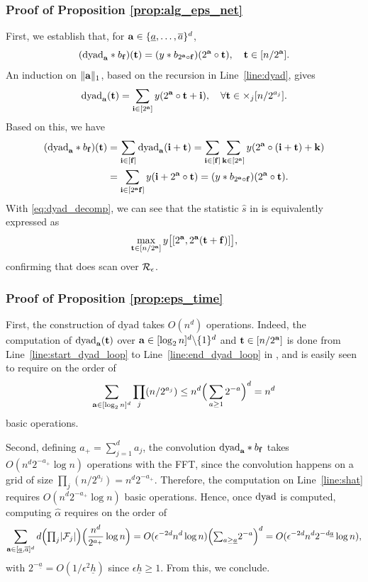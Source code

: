 \documentclass[twoside,11pt]{article}
\begin{document}
\subsubsection{Proof of Proposition \ref{prop:alg_eps_net}}
First, we establish that, for $\mathbf{a} \in \{ \underline a, \ldots, \overline a \}^d$,
\begin{equation}
\label{eq:dyad_decomp}
(\textrm{dyad}_{\mathbf{a}} \ast b_{\mathbf{f}})(\mathbf{t}) = (y \ast b_{2^{\mathbf{a}} \circ \mathbf{f}})(2^{\mathbf{a}} \circ \mathbf{t}), \quad \mathbf{t} \in [n / 2^{\mathbf{a}}].
\end{equation}
An induction on $\|\mathbf{a}\|_1$, based on the recursion in Line~\ref{line:dyad}, 
gives
\[
\textrm{dyad}_{\mathbf{a}}(\mathbf{t}) = \sum_{\mathbf{i} \in [2^{\mathbf{a}}]} y(2^{\mathbf{a}} \circ \mathbf{t} + \mathbf{i}), \quad \forall \mathbf{t} \in \times_j [n / 2^{a_j}].
\]
Based on this, we have
\[\begin{split}
(\textrm{dyad}_{\mathbf{a}} \ast b_{\mathbf{f}})(\mathbf{t}) 
&= \sum_{\mathbf{i} \in [\mathbf{f}]} \textrm{dyad}_{\mathbf{a}} (\mathbf{i} + \mathbf{t}) = \sum_{\mathbf{i} \in [\mathbf{f}]} \sum_{\mathbf{k} \in [2^{\mathbf{a}}]} y(2^{\mathbf{a}} \circ (\mathbf{i} + \mathbf{t}) + \mathbf{k}) \\
&= \sum_{\mathbf{i} \in [2^{\mathbf{a}} \mathbf{f}]} y(\mathbf{i} + 2^{\mathbf{a}} \circ \mathbf{t}) = (y \ast b_{2^{\mathbf{a}} \circ \mathbf{f}}) (2^{\mathbf{a}} \circ \mathbf{t}).
\end{split}\]
With \eqref{eq:dyad_decomp}, we can see that the statistic $\hat s$ in  is equivalently expressed as
\[
\max_{\mathbf{t} \in [n / 2^{\mathbf{a}}]} y\big[ [2^{\mathbf{a}}, 2^{\mathbf{a}} (\mathbf{t} + \mathbf{f}) ] \big],
\]
confirming that  does scan over $\mathcal{R}_\epsilon$.


\subsubsection{Proof of Proposition \ref{prop:eps_time}}
First, the construction of $\textrm{dyad}$ takes $O(n^d)$ operations.
Indeed, the computation of $\textrm{dyad}_{\mathbf{a}}(\mathbf{t})$ over $\mathbf{a} \in [\log_2 n]^d \backslash \{1\}^d$ and $\mathbf{t} \in [n/2^{\mathbf{a}}]$ is done from Line~\ref{line:start_dyad_loop} to Line~\ref{line:end_dyad_loop} in , and is easily seen to require on the order of
\[
\sum_{\mathbf{a} \in [\log_2 n]^d} \prod_j (n/2^{a_j}) \le n^d \Big(\sum_{a \ge 1} 2^{-a}\Big)^d = n^d
\] 
basic operations. 

Second, defining $a_+ = \sum_{j=1}^d a_j$, the convolution $\textrm{dyad}_{\mathbf{a}} \ast b_{\mathbf{f}}$ takes $O(n^d 2^{-a_+} \log n)$ operations with the FFT, since the convolution happens on a grid of size $\prod_j (n/2^{a_j}) = n^d 2^{-a_+}$.
Therefore, the computation on Line~\ref{line:shat} requires $O(n^d 2^{-a_+} \log n)$ basic operations.
Hence, once ${\rm dyad}$ is computed, computing $\hat \alpha$ requires on the order of 
\[
\sum_{\mathbf{a} \in [\underline a, \overline a]^d} d \Big({\textstyle\prod}_j |\mathcal{F}_j|\Big) \Big(\frac{n^d}{2^{a_+}} \log n\Big) = O(\epsilon^{-2d} n^d \log n) \Big({\textstyle\sum}_{a \ge \underline a} 2^{-a}\Big)^d = O(\epsilon^{-2d} n^d 2^{-d \underline a} \log n ),
\]
with $2^{-\underline a} = O(1/\epsilon^2 \underline h)$ since $\epsilon \underline h \ge 1$.
From this, we conclude.
\end{document}
